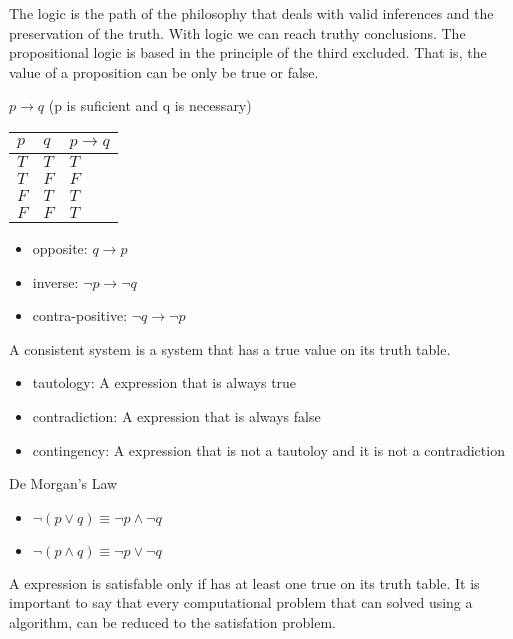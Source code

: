 
\par The logic is the path of the philosophy that deals with valid inferences and the preservation of the truth. With logic we can reach truthy conclusions.
The propositional logic is based in the principle of the third excluded. That is, the value of a proposition can be only be true or false.

\begin{note}
    \begin{center}
       \par $
            p \rightarrow q
        $ (p is suficient and q is necessary)
        \hspace{3.5em}
        \begin{tabular} {| m{1cm} | m{1cm} | m{1cm} |}
        \hline $p$ & $q$ & $p \rightarrow q$ \\
        \hline $T$ & $T$ & $T$ \\ 
        \hline $T$ & $F$ & $F$ \\ 
        \hline $F$ & $T$ & $T$ \\ 
        \hline $F$ & $F$ & $T$ \\
        \hline 
        \end{tabular}
    \end{center}

    \begin{itemize}
        \item opposite: $q \rightarrow p$
        \item inverse: $\lnot p \rightarrow \lnot q$
        \item contra-positive: $\lnot q \rightarrow \lnot p$
    \end{itemize}  
\end{note}

\par A consistent system is a system that has a true value on its truth table.

\begin{itemize}
    \item tautology: A expression that is always true
    \item contradiction: A expression that is always false
    \item contingency: A expression that is not a tautoloy and it is not a contradiction
\end{itemize}

\begin{theorem}
    De Morgan's Law
    \begin{itemize}
        \item $\lnot (p \lor q) \equiv \lnot p \land \lnot q$        
        \item $\lnot (p \land q) \equiv \lnot p \lor \lnot q$
    \end{itemize}   
\end{theorem}

\par A expression is satisfable only if has at least one true on its truth table. It is important to say that every computational problem that can solved using a algorithm, can be reduced to the satisfation problem.

\newpage